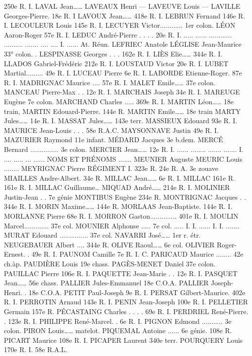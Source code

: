 \documentclass[a4paper,11pt]{book}
\begin{document}
250e R. I.
LAVAL Jean……
LAVEAUX Henri
—
LAVEUVE Louis
—
LAVILLE Georges-Pierre. 18e R. I
LAVOUX Jean……
418e R. I.
LEBRUN Fernand
146e R. I.
LECOULEUR Louis
145e R. I.
LECUYER Victor............ 1er colon.
LÉON Aaron-Roger
57e R. I.
LEDUC André-Pierre . . . . 20e R.
I.
.....
......
............
..........
.......
....
....
I.
...... At. Réun.
LEFRIEC Anatole
LÉGLISE Jean-Maurice
33° colon.
.
LESPINASSE Georges . . . 162e R. I.
LIÈS Elie……
344e R. I.
LLADOS Gabriel-Frédéric 212e R. I.
LOUSTAUD Victor
20e R. I.
LUBET Martial.........
49e R. I.
LUCEAU Pierre
6e R. I.
LABORDE Etienne-Roger. 87e R. I.
MADRIGNAC Maurice .... 57e R. I.
MALET Emile……
37e colon.
MANCEAU Pierre-Max . . 12e R. I.
MARCHAIS Joseph
34e R. I.
MAREUGE Eugène
7e colon.
MARCHAND Charles ..... 369e R. I.
MARTIN Léon……
18e train,
MARTIN Edouard-Pierre. 144e R.
MARTIN Emile……
18e train
MARTY Jules……
14e R. I.
MASSAT Jules……
143e terr.
MASSIEUX Edouard
93e R. I.
MAURICE Jean-Louis . . . 58e R.A.C.
MAYSONNAVE Justin
49e R. I.
MAZURIER Raymond
11e infant.
MÉDARD Jacques
3e b.dem.
MERCÉ Bernard ............... 3e colon.
MERCIER Jean……
12e R. I.
......
........
.......
.......
I.
....
.....
...
......
NOMS ET PRÉNOMS
.......
MEUNIER Auguste
MEURIC Louis ........
MEYRIGNAC Pierre
RÉGIMENT
I.
323e R.
24e R. A.
3e zouave
MIAILLES Andre-Albert. 34e R.
MILLAC Jean……
6e R. I.
MILLAC
161e R.
161e
R. I.
MILLAC Guillaume…
MIQUAD André……
214e R. I.
MOLINIER Justin-Jean . . 7e génie
MONTIBUS Eugène
234e R.
MONTRIGNAC Jacques . . 344e R. I.
MORIN Maxime……
144e R.
MORLAAS Jean-Baptiste. 144e R. I.
MORLANNE Pierre
68e R. I.
MORRON Gaston..............
401e R. I.
MOULIN Marcel.............
37e col.
MOUNIER Alphonse ..... 7e col.
.....
I.
I.
......
I.
I.
.......
MURAT Edouard ............... 37e col.
NAVARRI José……
1er r. étr.
NEUGEBAUER Albert ....
344e R.
OLIVE Raoul……
6e col.
OLIVIER Roger-Ernest. . 49e R. I.
PAUNOM Camille
7e R. I. C.
PARICAUD Maurice ........ 42e ch.àp.
PAUDIÈRE Louis
19e chass.
PAGÈS-MENET Daniel
37e colon.
PAUILLAC Pierre
106e R. I.
PAQUETTE Jean-Marie . . 12e R. I.
PASQUET Jean……
56e chass.
PALLIER Jules-Emmanuel 18e C.O.A.
PALLIER Joseph-Henri. . 18e C.O.A.
PETIT Paul-Joseph
9e R. I.
PERSAT Gilbert-Maurice. 402e R. I.
PERROTIN Arnaud
143e R. I.
PENIN Jean-Joseph
100e R. I.
PELLETIER Germain
157e R.
PÉCASTAING Charles . . . . 69e R. I.
PERDRIEL René-Pierre. . 123e R. I.
PHILIPPE René-Marcel. . 6e R. I.
PIGNON Edmond ........... 3e colon.
PIRON Louis……
matelot.
PIQUEMAL Antoine ...... 6e génie.
108e R.
PICART Maurice
108e
R. I.
PICAPER Laurent
340e terr.
POURQUERY Louis
170e R. I.
58e R.A.L.
\end{document}
